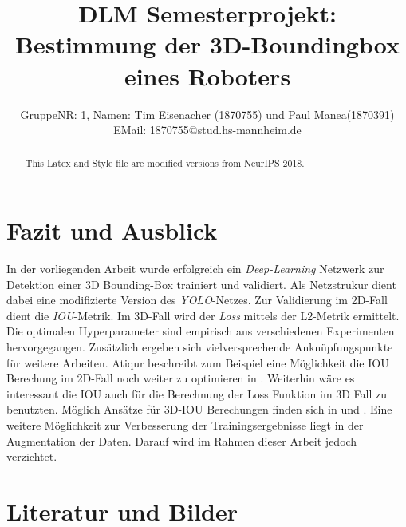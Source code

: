 \documentclass{article}
\title{DLM Semesterprojekt: Bestimmung der 3D-Boundingbox eines Roboters}
\author{%
  GruppeNR: 1, Namen: Tim Eisenacher (1870755) und Paul Manea(1870391) \\
  EMail: 1870755@stud.hs-mannheim.de
}
\begin{document}

\maketitle


\begin{abstract}
	This Latex and Style file are modified versions from NeurIPS 2018.\citep{Atiqur}
	
\end{abstract}
\newpage
 



 


\newpage
\section{Fazit und Ausblick}

In der vorliegenden Arbeit wurde erfolgreich ein \textit{Deep-Learning} Netzwerk zur Detektion einer 3D Bounding-Box trainiert und validiert. Als Netzstrukur dient dabei eine modifizierte Version des \textit{YOLO}-Netzes. Zur Validierung im 2D-Fall dient die \textit{IOU}-Metrik. Im 3D-Fall wird der \textit{Loss} mittels der L2-Metrik ermittelt. Die optimalen Hyperparameter sind empirisch aus verschiedenen Experimenten hervorgegangen.
Zusätzlich ergeben sich vielversprechende Anknüpfungspunkte für weitere Arbeiten. Atiqur beschreibt zum Beispiel eine Möglichkeit die IOU Berechung im 2D-Fall noch weiter zu optimieren in \cite{Atiqur}. Weiterhin wäre es interessant die IOU auch für die Berechnung der Loss Funktion im 3D Fall zu benutzten. Möglich Ansätze für 3D-IOU Berechungen finden sich in \cite{Xu2019} und \cite{Mousavian1612}. Eine weitere Möglichkeit zur Verbesserung der Trainingsergebnisse liegt in der Augmentation der Daten. Darauf wird im Rahmen dieser Arbeit jedoch verzichtet.


\section{Literatur und Bilder}



\listoffigures
\end{document}
